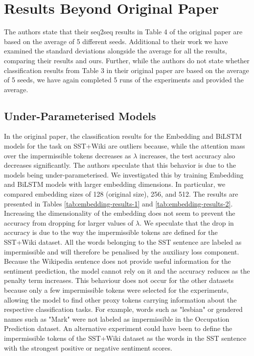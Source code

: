 \section{Results Beyond Original Paper}

The authors state that their seq2seq results in Table 4 of the original paper are based on the average of 5 different seeds. Additional to their work we have examined the standard deviations alongside the average for all the results, comparing their results and ours. Further, while the authors do not state whether classification results from Table 3 in their original paper are based on the average of 5 seeds, we have again completed 5 runs of the experiments and provided the average.

\subsection{Under-Parameterised Models}
In the original paper, the classification results for the Embedding and BiLSTM models for the task on SST+Wiki are outliers because, while the attention mass over the impermissible tokens decreases as $\lambda$ increases, the test accuracy also decreases significantly. The authors speculate that this behavior is due to the models being under-parameterised. We investigated this by training Embedding and BiLSTM models with larger embedding dimensions. In particular, we compared embedding sizes of 128 (original size), 256, and 512. The results are presented in Tables \ref{tab:embedding-results-1} and \ref{tab:embedding-results-2}. Increasing the dimensionality of the embedding does not seem to prevent the accuracy from dropping for larger values of $\lambda$. We speculate that the drop in accuracy is due to the way the impermissible tokens are defined for the SST+Wiki dataset. All the words belonging to the SST sentence are labeled as impermissible and will therefore be penalised by the auxiliary loss component. Because the Wikipedia sentence does not provide useful information for the sentiment prediction, the model cannot rely on it and the accuracy reduces as the penalty term increases. This behaviour does not occur for the other datasets because only a few impermissible tokens were selected for the experiments, allowing the model to find other proxy tokens carrying information about the respective classification tasks. For example, words such as "lesbian" or gendered names such as "Mark" were not labeled as impermissible in the Occupation Prediction dataset. An alternative experiment could have been to define the impermissible tokens of the SST+Wiki dataset as the words in the SST sentence with the strongest positive or negative sentiment scores.

